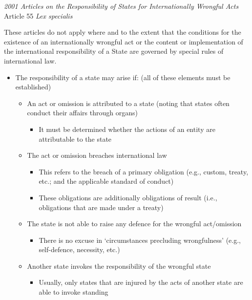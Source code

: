 \begin{conventiondetails}{\textit{2001 Articles on the Responsibility of States for Internationally Wrongful Acts} Article 55}
    \flushleft
    \textit{Lex specialis}

    \vspace{\baselineskip}

    These articles do not apply where and to the extent that the conditions for the existence of an internationally wrongful act or the content or implementation of the international responsibility of a State are governed by special rules of international law.
\end{conventiondetails}

\begin{itemize}
    \item The responsibility of a state may arise if: (all of these elements must be established)
    \begin{itemize}
        \item An act or omission is attributed to a state (noting that states often conduct their affairs through organs)
        \begin{itemize}
            \item It must be determined whether the actions of an entity are attributable to the state
        \end{itemize}
        \item The act or omission breaches international law
        \begin{itemize}
            \item This refers to the breach of a primary obligation (e.g., custom, treaty, etc.; and the applicable standard of conduct)
            \item These obligations are additionally obligations of result (i.e., obligations that are made under a treaty)
        \end{itemize}
        \item The state is not able to raise any defence for the wrongful act/omission
        \begin{itemize}
            \item There is no excuse in `circumstances precluding wrongfulness' (e.g., self-defence, necessity, etc.)
        \end{itemize}
        \item Another state invokes the responsibility of the wrongful state
        \begin{itemize}
            \item Usually, only states that are injured by the acts of another state are able to invoke standing
        \end{itemize}
    \end{itemize}
\end{itemize}

